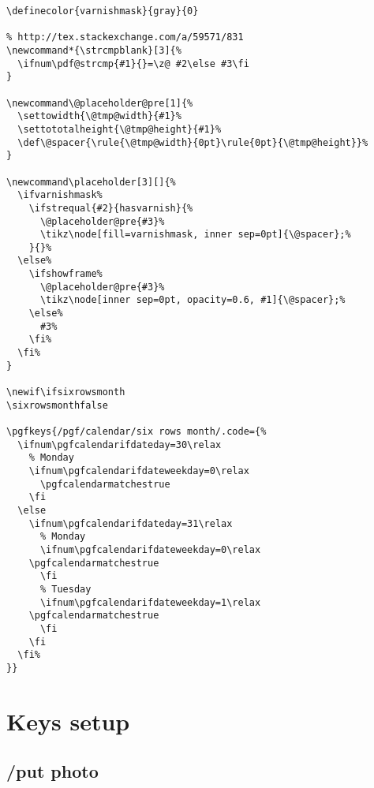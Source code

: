 \documentclass[11pt,oneside]{memoir-article}
\begin{document}
\begin{verbatim}
\definecolor{varnishmask}{gray}{0}

% http://tex.stackexchange.com/a/59571/831
\newcommand*{\strcmpblank}[3]{%
  \ifnum\pdf@strcmp{#1}{}=\z@ #2\else #3\fi
}

\newcommand\@placeholder@pre[1]{%
  \settowidth{\@tmp@width}{#1}%
  \settototalheight{\@tmp@height}{#1}%
  \def\@spacer{\rule{\@tmp@width}{0pt}\rule{0pt}{\@tmp@height}}%
}

\newcommand\placeholder[3][]{%
  \ifvarnishmask%
    \ifstrequal{#2}{hasvarnish}{%
      \@placeholder@pre{#3}%
      \tikz\node[fill=varnishmask, inner sep=0pt]{\@spacer};%
    }{}%
  \else%
    \ifshowframe%
      \@placeholder@pre{#3}%
      \tikz\node[inner sep=0pt, opacity=0.6, #1]{\@spacer};%
    \else%
      #3%
    \fi%
  \fi%
}

\newif\ifsixrowsmonth  
\sixrowsmonthfalse

\pgfkeys{/pgf/calendar/six rows month/.code={%
  \ifnum\pgfcalendarifdateday=30\relax
    % Monday
    \ifnum\pgfcalendarifdateweekday=0\relax
      \pgfcalendarmatchestrue
    \fi
  \else
    \ifnum\pgfcalendarifdateday=31\relax
      % Monday
      \ifnum\pgfcalendarifdateweekday=0\relax
	\pgfcalendarmatchestrue
      \fi
      % Tuesday
      \ifnum\pgfcalendarifdateweekday=1\relax
	\pgfcalendarmatchestrue
      \fi
    \fi
  \fi%
}}
\end{verbatim}

\chapter{Keys setup}
\label{sec:orgf165351}
\section{/put photo}
\label{sec:org898338f}
\end{document}

